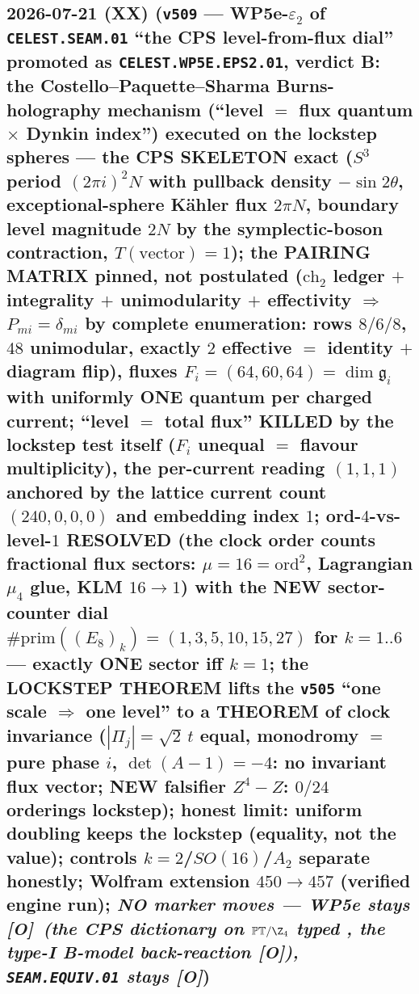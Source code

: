 \documentclass[11pt]{article}
\providecommand{\mO}{\textbf{[O]}}\providecommand{\mX}{\textbf{[X]}}
\begin{document}
\subsection*{2026-07-21 (XX) (\texttt{v509} --- WP5e-$\varepsilon_2$ of \texttt{CELEST.SEAM.01} ``the CPS level-from-flux dial'' promoted as \texttt{CELEST.WP5E.EPS2.01}, verdict B: the Costello--Paquette--Sharma Burns-holography mechanism (``level $=$ flux quantum $\times$ Dynkin index'') executed on the lockstep spheres --- the CPS SKELETON exact ($S^3$ period $(2\pi i)^2N$ with pullback density $-\sin2\theta$, exceptional-sphere K\"ahler flux $2\pi N$, boundary level magnitude $2N$ by the symplectic-boson contraction, $T(\text{vector})=1$); the PAIRING MATRIX pinned, not postulated ($\mathrm{ch}_2$ ledger $+$ integrality $+$ unimodularity $+$ effectivity $\Rightarrow$ $P_{mi}=\delta_{mi}$ by complete enumeration: rows $8/6/8$, $48$ unimodular, exactly $2$ effective $=$ identity $+$ diagram flip), fluxes $F_i=(64,60,64)=\dim\mathfrak g_i$ with uniformly ONE quantum per charged current; ``level $=$ total flux'' KILLED by the lockstep test itself ($F_i$ unequal $=$ flavour multiplicity), the per-current reading $(1,1,1)$ anchored by the lattice current count $(240,0,0,0)$ and embedding index $1$; ord-$4$-vs-level-$1$ RESOLVED (the clock order counts fractional flux sectors: $\mu=16=\mathrm{ord}^2$, Lagrangian $\mu_4$ glue, KLM $16\to1$) with the NEW sector-counter dial $\#\mathrm{prim}((E_8)_k)=(1,3,5,10,15,27)$ for $k=1..6$ --- exactly ONE sector iff $k=1$; the LOCKSTEP THEOREM lifts the \texttt{v505} ``one scale $\Rightarrow$ one level'' to a THEOREM of clock invariance ($|\Pi_j|=\sqrt2\,t$ equal, monodromy $=$ pure phase $i$, $\det(A{-}1)=-4$: no invariant flux vector; NEW falsifier $Z^4{-}Z$: $0/24$ orderings lockstep); honest limit: uniform doubling keeps the lockstep (equality, not the value); controls $k{=}2$/$SO(16)$/$A_2$ separate honestly; Wolfram extension $450\to457$ (verified engine run); \emph{NO marker moves --- WP5e stays \mO\ (the CPS dictionary on $\mathbb{PT}/\Z_4$ typed \mC, the type-I B-model back-reaction \mO), \texttt{SEAM.EQUIV.01} stays \mO})}
\end{document}
